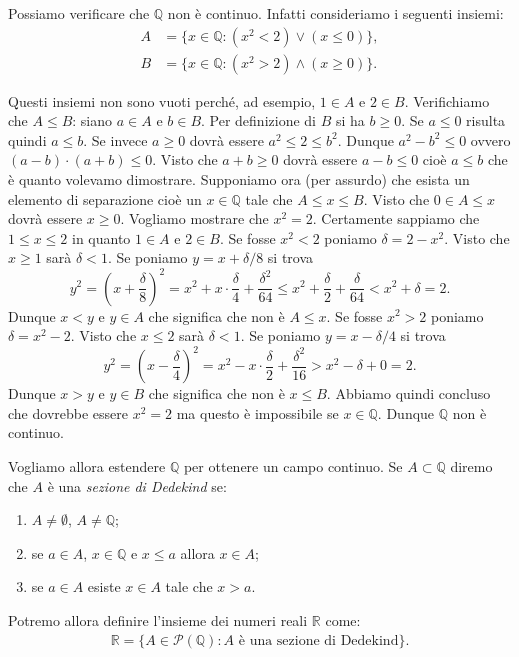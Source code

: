 \documentclass[italian,a4paper,hidelinks,headinclude]{scrartcl}
\newcommand{\QQ}{{\mathbb Q}}
\newcommand{\RR}{{\mathbb R}}
\renewcommand{\P}{{\mathcal P}}
\newcommand{\myemph}[1]{\emph{#1}\marginpar{#1}}
\newcommand{\enclose}[1]{\left({#1}\right)}
\begin{document}
Possiamo verificare che $\QQ$ non è continuo.
Infatti consideriamo i seguenti insiemi:
\begin{equation}\label{eq:38274}
  \begin{aligned}
  A&=\{x\in \QQ\colon (x^2 < 2) \lor (x\le 0)\},
  \\
  B&=\{x\in \QQ\colon (x^2 > 2) \land (x\ge 0)\}.
\end{aligned}
\end{equation}

Questi insiemi non sono vuoti perché, ad esempio, $1\in A$ e $2\in B$.
Verifichiamo che $A \le B$: siano $a\in A$ e $b\in B$.
Per definizione di $B$ si ha $b\ge 0$. Se $a\le 0$ risulta quindi $a \le b$.
Se invece $a\ge 0$ dovrà essere $a^2 \le 2 \le b^2$.
Dunque $a^2 - b^2 \le 0$ ovvero $(a-b)\cdot (a+b)\le 0$.
Visto che $a+b\ge 0$ dovrà essere $a-b\le 0$ cioè $a\le b$ che è quanto volevamo
dimostrare.
Supponiamo ora (per assurdo) che esista un elemento di separazione cioè
un $x\in \QQ$ tale che $A \le x \le B$. Visto che $0\in A \le x$
dovrà essere $x\ge 0$. Vogliamo mostrare che $x^2 = 2$.
Certamente sappiamo che $1\le x \le 2$ in quanto $1 \in A$ e $2\in B$.
Se fosse $x^2 < 2$
poniamo $\delta = 2 - x^2$. Visto che $x\ge 1$ sarà $\delta < 1$.
Se poniamo $y=x+\delta/8$ si trova
\[
  y^2 = \enclose{x+\frac \delta 8}^2 = x^2 + x \cdot \frac \delta 4 + \frac {\delta^2}{64}
  \le x^2 + \frac \delta 2 + \frac \delta {64} < x^2 + \delta = 2.
\]
Dunque $x < y$ e $y\in A$ che significa che non è $A \le x$.
Se fosse $x^2>2$ poniamo $\delta = x^2-2$. Visto che $x\le 2$ sarà $\delta <1$.
Se poniamo $y=x-\delta/4$ si trova
\[
  y^2 = \enclose{x-\frac \delta 4}^2
  = x^2 - x \cdot \frac \delta 2 + \frac{\delta^2}{16}
  > x^2 - \delta + 0  = 2.
\]
Dunque $x > y$ e $y\in B$ che significa che non è $x\le B$.
Abbiamo quindi concluso che dovrebbe essere $x^2=2$ ma
questo è impossibile se $x\in \QQ$. Dunque $\QQ$ non è continuo.

Vogliamo allora estendere $\QQ$ per ottenere un campo continuo.
Se $A\subset \QQ$ diremo che $A$ è una \myemph{sezione di Dedekind}
se:
\begin{enumerate}
  \item $A\neq \emptyset$, $A \neq \QQ$;
  \item se $a\in A$, $x\in \QQ$ e $x\le a$ allora $x\in A$;
  \item se $a\in A$ esiste $x\in A$ tale che $x>a$.
\end{enumerate}

Potremo allora definire
l'insieme dei numeri reali \myemph{$\RR$} come:
\begin{align*}
  \RR = \{A\in \P(\QQ)\colon
  \text{$A$ è una sezione di Dedekind} \}.
\end{align*}
\end{document}

